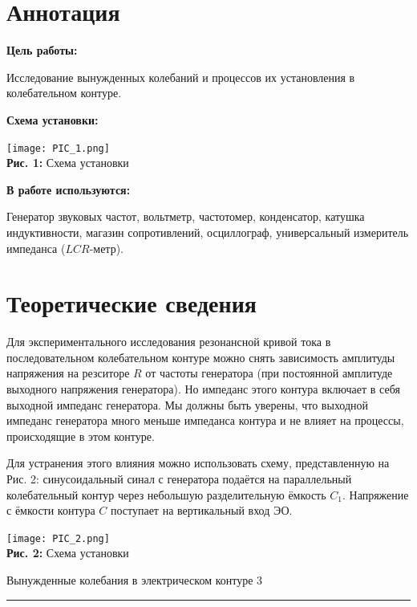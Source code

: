 \documentclass[12pt,a4paper]{scrartcl}
\begin{document}
	\section{Аннотация}
	
	\textbf{Цель работы: }
	
	Исследование вынужденных колебаний и процессов их установления в колебательном контуре.
	
	\textbf{Схема установки:}
	\begin{center}
		\texttt{[image: PIC\_1.png]}
		\\\textbf{Рис. 1:} Схема установки
	\end{center}	
		
	\textbf{В работе используются:}
	
	Генератор звуковых частот, вольтметр, частотомер, конденсатор, катушка индуктивности, магазин сопротивлений, осциллограф, универсальный измеритель импеданса ($LCR$-метр).
	
	\section{Теоретические сведения}
	Для экспериментального исследования резонансной кривой тока в последовательном колебательном контуре можно снять зависимость амплитуды напряжения на резситоре $R$ от частоты генератора (при постоянной амплитуде выходного напряжения генератора). Но импеданс этого контура включает в себя выходной импеданс генератора. Мы должны быть уверены, что выходной импеданс генератора много меньше импеданса контура и не влияет на процессы, происходящие в этом контуре.
	
	Для устранения этого влияния можно использовать схему, представленную на Рис. 2: синусоидальный синал с генератора подаётся на параллельный колебательный контур через небольшую разделительную ёмкость $C_1$. Напряжение с ёмкости контура $C$ поступает на вертикальный вход ЭО.
	
	\begin{center}
		\texttt{[image: PIC\_2.png]}
		\\\textbf{Рис. 2:} Схема установки
	\end{center}
	
	\newpage 
	
	
	\begin{flushleft}
		\footnotesize{Вынужденные колебания в электрическом контуре} \hspace{\fill} \footnotesize{3}
		\\[-0.3cm]\noindent\rule{\textwidth}{0.3pt}
	\end{flushleft}
	
\end{document}
